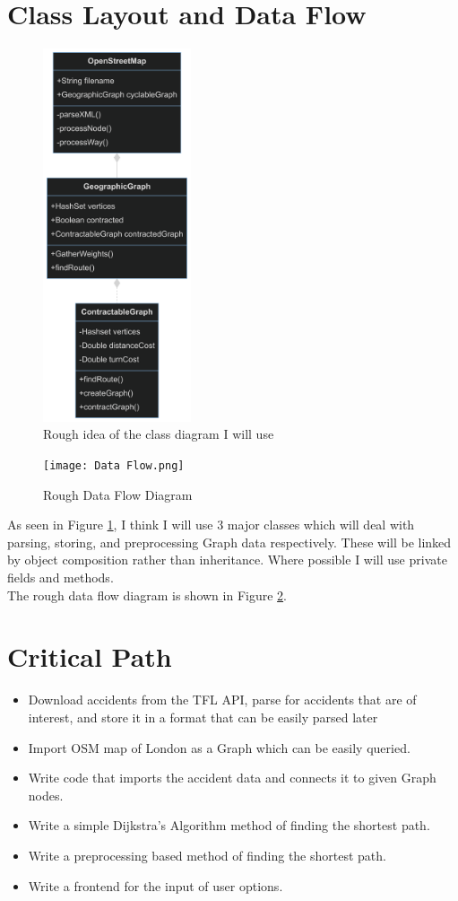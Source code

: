 \documentclass[11pt,twoside,a4paper]{report}
\begin{document}
\section{Class Layout and Data Flow}
\begin{figure}[t]
    \begin{center}
    \includegraphics[height=11cm]{classdiagram.png}
    \end{center}
    \caption{Rough idea of the class diagram I will use}
    \label{Class Diagram Simple}
\end{figure}
\begin{figure}[p]
    \begin{center}
        \texttt{[image: Data Flow.png]}
    \end{center}
    \caption{Rough Data Flow Diagram}
    \label{dataflow}
\end{figure}
As seen in Figure \ref{Class Diagram Simple}, I think I will use 3 major classes which will deal with parsing, storing, and preprocessing Graph data respectively. These will be linked by object composition
rather than inheritance. Where possible I will use private fields and methods. \\
The rough data flow diagram is shown in Figure \ref{dataflow}.
\section{Critical Path}
\begin{itemize} 
    \item Download accidents from the TFL API, parse for accidents that are of interest, and store it in a format that can be easily parsed later
    \item Import OSM map of London as a Graph which can be easily queried.
    \item Write code that imports the accident data and connects it to given Graph nodes.
    \item Write a simple Dijkstra's Algorithm method of finding the shortest path.
    \item Write a preprocessing based method of finding the shortest path.
    \item Write a frontend for the input of user options.
\end{itemize}
\newpage
\end{document}
